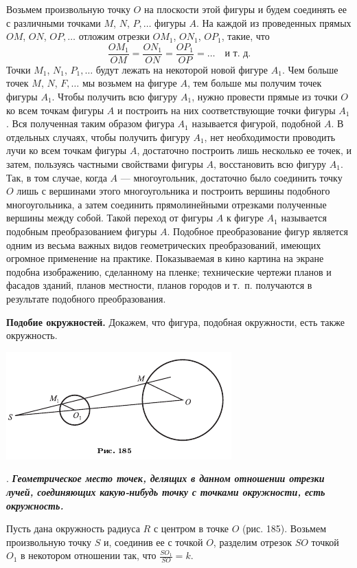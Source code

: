 \documentclass[oneside]{book}
\begin{document}
Возьмем произвольную точку $O$ на плоскости этой фигуры и будем соединять ее с различными точками $M$, $N$, $P,\dots$
фигуры $A$.
На каждой из проведенных прямых $OM$, $ON$, $OP,\dots$
отложим отрезки $OM_1$, $ON_1$, $OP_1$, такие, что 
\[\frac{OM_1}{OM}=\frac{ON_1}{ON}=\frac{OP_1}{OP}=\dots\quad\text{и т.~д.}\]
Точки $M_1$, $N_1$, $P_1,\dots$ будут лежать на некоторой новой фигуре $A_1$.
Чем больше точек $M$, $N$, $F,\dots$
мы возьмем на фигуре $A$, тем больше мы получим точек фигуры $A_1$.
Чтобы получить всю фигуру $A_1$, нужно провести прямые из точки $O$ ко всем точкам фигуры $A$ и построить на них соответствующие точки фигуры $A_1$.
Вся полученная таким образом фигура $A_1$ называется фигурой, подобной $A$.
В отдельных случаях, чтобы получить фигуру $A_1$, нет необходимости проводить лучи ко всем точкам фигуры $A$, достаточно построить лишь несколько ее точек, и затем, пользуясь частными свойствами фигуры $A$, восстановить всю фигуру $A_1$.
Так, в том случае, когда $A$ — многоугольник, достаточно было соединить точку $O$ лишь с вершинами этого многоугольника и построить вершины подобного многоугольника, а затем соединить прямолинейными отрезками полученные вершины между собой.
Такой переход от фигуры $A$ к фигуре $A_1$ называется подобным преобразованием фигуры $A$.
Подобное преобразование фигур является одним из весьма важных видов геометрических преобразований, имеющих огромное применение на практике.
Показываемая в кино картина на экране подобна изображению, сделанному на пленке;
технические чертежи планов и фасадов зданий, планов местности, планов городов и т.~п.
получаются в результате подобного преобразования.

\textbf{Подобие окружностей.}
Докажем, что фигура, подобная окружности, есть также окружность.

\includegraphics{pics/ris-185}

.
\textbf{\emph{Геометрическое место точек, делящих в данном отношении отрезки лучей, соединяющих какую-нибудь точку с точками окружности, есть окружность.}}

Пусть дана окружность радиуса $R$ с центром в точке $O$ (рис. 185).
Возьмем произвольную точку $S$ и, соединив ее с точкой $O$, разделим отрезок $SO$ точкой $O_1$ в некотором отношении так, что $\frac{SO_1}{SO}= k$.
\end{document}
